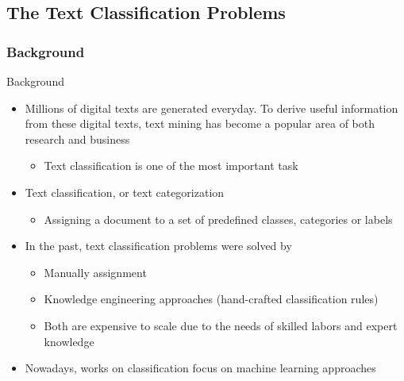 \subsection{The Text Classification Problems}
\subsubsection{Background}
\begin{frame}{Background}
\begin{itemize}
\item Millions of digital texts are generated everyday. To derive useful information from these digital texts, text
mining has become a popular area of both research and business
	\begin{itemize}
	\item Text classification is one of the most important task
	\end{itemize}
\item \alert{Text classification}, or text categorization
	\begin{itemize}
	\item Assigning a document to a set of predefined classes, categories or labels
	\end{itemize}
\item In the past, text classification problems were solved by
	\begin{itemize}
	\item Manually assignment
	\item Knowledge engineering approaches (hand-crafted classification rules)
	\item Both are expensive to scale due to the needs of skilled labors and expert knowledge
	\end{itemize}
\item Nowadays, works on classification focus on \alert{machine learning approaches}
\end{itemize}
\end{frame}

